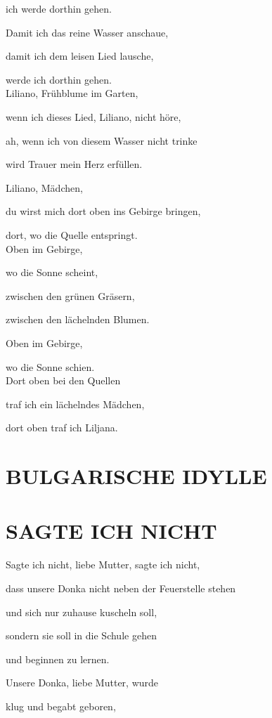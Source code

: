 \documentclass[11pt,a5paper,twoside]{article}
\begin{document}
ich werde dorthin gehen.

Damit ich das reine Wasser anschaue,

damit ich dem leisen Lied lausche,

werde ich dorthin gehen.\\


Liliano, Frühblume im Garten,

wenn ich dieses Lied, Liliano, nicht höre,

ah, wenn ich von diesem Wasser nicht trinke

wird Trauer mein Herz erfüllen.

Liliano, Mädchen,

du wirst mich dort oben ins Gebirge bringen,

dort, wo die Quelle entspringt.\\

Oben im Gebirge,

wo die Sonne scheint,

zwischen den grünen Gräsern,

zwischen den lächelnden Blumen.

Oben im Gebirge,

wo die Sonne schien.\\


Dort oben bei den Quellen 

traf ich ein lächelndes Mädchen,

dort oben traf ich Liljana.\\

\section[Bulgarische Idylle]{BULGARISCHE IDYLLE}


\section[Sagte ich nicht]{SAGTE ICH NICHT}

Sagte ich nicht, liebe Mutter, sagte ich nicht,

dass unsere Donka nicht neben der Feuerstelle stehen

und sich nur zuhause kuscheln soll,

sondern sie soll in die Schule gehen 

und beginnen zu lernen.

Unsere Donka, liebe Mutter, wurde 

klug und begabt geboren,
\end{document}
